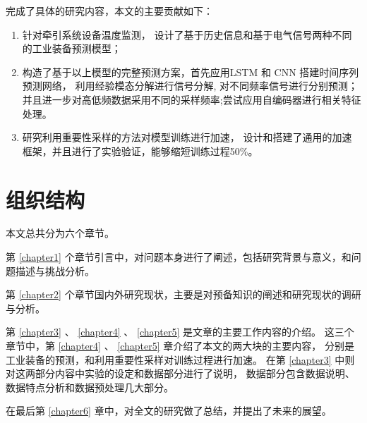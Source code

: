 完成了具体的研究内容，本文的主要贡献如下：

\begin{enumerate}
  \item 针对牵引系统设备温度监测，
  设计了基于历史信息和基于电气信号两种不同的工业装备预测模型； 
  \item 构造了基于以上模型的完整预测方案，首先应用LSTM 和 CNN 搭建时间序列预测网络，
  利用经验模态分解进行信号分解,
  对不同频率信号进行分别预测；
  并且进一步对高低频数据采用不同的采样频率;尝试应用自编码器进行相关特征处理。 
  \item 研究利用重要性采样的方法对模型训练进行加速， 设计和搭建了通用的加速框架，并且进行了实验验证，能够缩短训练过程50\%。
\end{enumerate}

\section{组织结构}
本文总共分为六个章节。

第 \ref{chapter1} 个章节引言中，对问题本身进行了阐述，包括研究背景与意义，和问题描述与挑战分析。

第 \ref{chapter2} 个章节国内外研究现状，主要是对预备知识的阐述和研究现状的调研与分析。

第 \ref{chapter3} 、 \ref{chapter4} 、 \ref{chapter5} 是文章的主要工作内容的介绍。
这三个章节中，第 \ref{chapter4} 、 \ref{chapter5} 章介绍了本文的两大块的主要内容，
分别是工业装备的预测，和利用重要性采样对训练过程进行加速。
在第 \ref{chapter3} 中则对这两部分内容中实验的设定和数据部分进行了说明，
数据部分包含数据说明、数据特点分析和数据预处理几大部分。

在最后第  \ref{chapter6} 章中，对全文的研究做了总结，并提出了未来的展望。